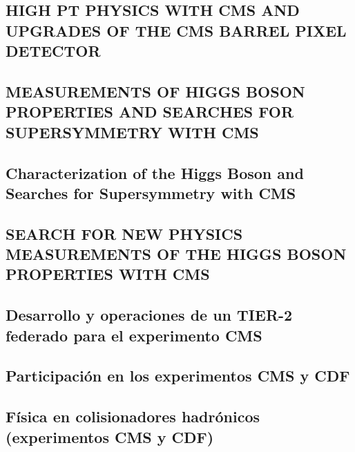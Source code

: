 \documentclass[a4paper, 11pt, twoside, openright]{report}
\begin{document}
\subsection{HIGH PT PHYSICS WITH CMS AND UPGRADES OF THE CMS BARREL PIXEL DETECTOR}


\subsection{MEASUREMENTS OF HIGGS BOSON PROPERTIES AND SEARCHES FOR SUPERSYMMETRY WITH CMS}


\subsection{Characterization of the Higgs Boson and Searches for Supersymmetry with CMS}


\subsection{SEARCH FOR NEW PHYSICS MEASUREMENTS OF THE HIGGS BOSON PROPERTIES WITH CMS}


\subsection{Desarrollo y operaciones de un TIER-2 federado para el experimento CMS}


\subsection{Participación en los experimentos CMS y CDF}


\subsection{Física en colisionadores hadrónicos (experimentos CMS y CDF)}

\end{document}
